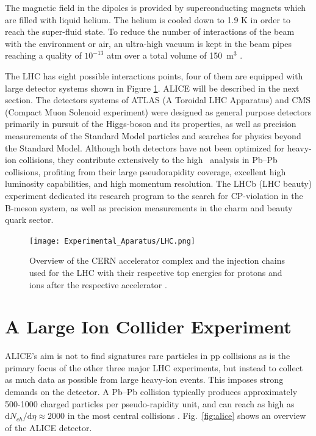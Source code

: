 The magnetic field in the dipoles is provided by superconducting magnets which are filled with liquid helium. The helium is cooled down to 1.9 K in order to reach the super-fluid state. To reduce the number of interactions of the beam with the environment or air, an ultra-high vacuum is kept in the beam pipes reaching a quality of $10^{-13}$ atm over a total volume of 150~m$^3$ \cite{Evans2008}.

The LHC has eight possible interactions points, four of them are equipped with large detector systems shown in Figure \ref{fig:lhc}. ALICE will be described in the next section. The detectors systems of ATLAS (A Toroidal LHC Apparatus) and CMS (Compact Muon Solenoid experiment) were designed as general purpose detectors primarily in pursuit of the Higgs-boson and its properties, as well as precision measurements of the Standard Model particles and searches for physics beyond the Standard Model. Although both detectors have not been optimized for heavy-ion collisions, they contribute extensively to the high \pt~analysis in Pb–Pb collisions, profiting from their large pseudorapidity coverage, excellent high luminosity capabilities, and high momentum resolution. The LHCb (LHC beauty) experiment dedicated its research program to the search for CP-violation in the B-meson system, as well as precision measurements in the charm and beauty quark sector.

\begin{figure}[htpb]
  \centering
	\texttt{[image: Experimental\_Aparatus/LHC.png]}
	\label{fig:lhc}
	\caption{Overview of the CERN accelerator complex and the injection chains used for the LHC with their respective top energies for protons and ions after the respective accelerator \cite{zotero-342}.}
\end{figure}

\FloatBarrier

\section{A Large Ion Collider Experiment}
\label{sec:ALICE}
ALICE's aim is not to find signatures rare particles in pp collisions as is the primary focus of the other three major LHC experiments, but instead to collect as much data as possible from large heavy-ion events. This imposes strong demands on the detector. A Pb–Pb collision typically produces approximately 500-1000 charged particles per pseudo-rapidity unit, and can reach as high as $\text{d}N_{ch}/\text{d}\eta \approx 2000$ in the most central collisions \cite{ALICECollaboration2016}. Fig.~\ref{fig:alice} shows an overview of the ALICE detector.


